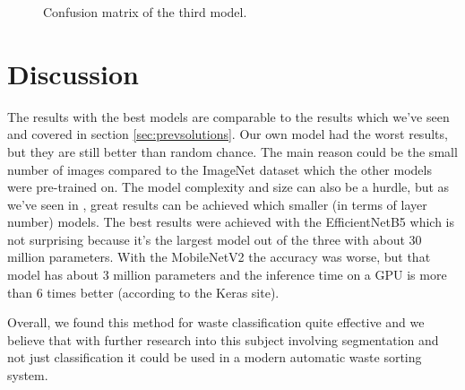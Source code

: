 \documentclass[twocolumn]{article}
\begin{document}
	\begin{figure}[ht]
		
		\centering
		\caption{Confusion matrix of the third model.}
		\label{fig:model3_conf}
	\end{figure}
	
	\section{Discussion}
	The results with the best models are comparable to the results which we've seen and covered in section \ref{sec:prevsolutions}.
	Our own model had the worst results, but they are still better than random chance. The main reason could be the small number of images compared to the ImageNet dataset which the other models were pre-trained on. The model complexity and size can also be a hurdle, but as we've seen in \cite{Chu2018}, great results can be achieved which smaller (in terms of layer number) models.
	The best results were achieved with the EfficientNetB5 which is not surprising because it's the largest model out of the three with about 30 million parameters. With the MobileNetV2 the accuracy was worse, but that model has about 3 million parameters and the inference time on a GPU is more than 6 times better (according to the Keras site).
	
	Overall, we found this method for waste classification quite effective and we believe that with further research into this subject involving segmentation and not just classification it could be used in a modern automatic waste sorting system.
	
	\newpage
	
	
	
\end{document}
